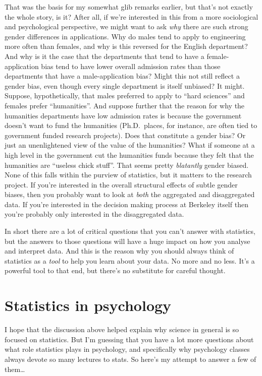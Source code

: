 \documentclass[
]{book}
\begin{document}
That was the basis for my somewhat glib remarks earlier, but that's not exactly the whole story, is it? After all, if we're interested in this from a more sociological and psychological perspective, we might want to ask \emph{why} there are such strong gender differences in applications. Why do males tend to apply to engineering more often than females, and why is this reversed for the English department? And why is it the case that the departments that tend to have a female-application bias tend to have lower overall admission rates than those departments that have a male-application bias? Might this not still reflect a gender bias, even though every single department is itself unbiased? It might. Suppose, hypothetically, that males preferred to apply to ``hard sciences'' and females prefer ``humanities''. And suppose further that the reason for why the humanities departments have low admission rates is because the government doesn't want to fund the humanities (Ph.D.~places, for instance, are often tied to government funded research projects). Does that constitute a gender bias? Or just an unenlightened view of the value of the humanities? What if someone at a high level in the government cut the humanities funds because they felt that the humanities are ``useless chick stuff''. That seems pretty \emph{blatantly} gender biased. None of this falls within the purview of statistics, but it matters to the research project. If you're interested in the overall structural effects of subtle gender biases, then you probably want to look at \emph{both} the aggregated and disaggregated data. If you're interested in the decision making process at Berkeley itself then you're probably only interested in the disaggregated data.

In short there are a lot of critical questions that you can't answer with statistics, but the answers to those questions will have a huge impact on how you analyse and interpret data. And this is the reason why you should always think of statistics as a \emph{tool} to help you learn about your data. No more and no less. It's a powerful tool to that end, but there's no substitute for careful thought.

\hypertarget{statistics-in-psychology}{%
\section{Statistics in psychology}\label{statistics-in-psychology}}

I hope that the discussion above helped explain why science in general is so focused on statistics. But I'm guessing that you have a lot more questions about what role statistics plays in psychology, and specifically why psychology classes always devote so many lectures to stats. So here's my attempt to answer a few of them\ldots{}
\end{document}
